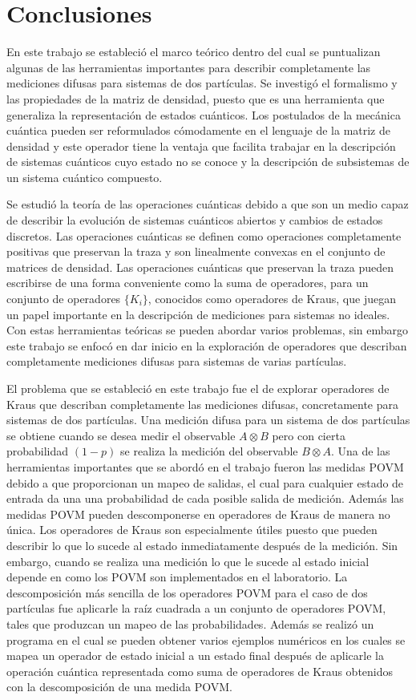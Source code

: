 \chapter{Conclusiones }

En este trabajo se estableció el marco teórico dentro del cual se puntualizan algunas de las herramientas importantes para describir completamente las mediciones difusas para sistemas de dos partículas. Se investigó el formalismo y las propiedades de la matriz de densidad, puesto que es una herramienta que generaliza la representación de estados cuánticos. Los postulados de la mecánica cuántica pueden ser reformulados cómodamente en el lenguaje de la matriz de densidad y este operador tiene la ventaja que facilita trabajar en la descripción de sistemas cuánticos cuyo estado no se conoce  y la descripción de subsistemas de un sistema cuántico compuesto. 

Se estudió la teoría de las operaciones cuánticas debido a que son un medio capaz de describir la evolución de sistemas cuánticos abiertos y cambios de estados discretos. Las operaciones cuánticas se definen como operaciones completamente positivas que preservan la traza y son linealmente convexas en el conjunto de matrices de densidad. Las operaciones cuánticas que preservan la traza pueden escribirse de una forma conveniente como la suma de operadores, para un conjunto de operadores $\{K_i\}$, conocidos como operadores de Kraus, que juegan un papel importante en la descripción de mediciones para sistemas no ideales. Con estas herramientas teóricas se pueden abordar varios problemas, sin embargo este trabajo se enfocó en dar inicio en la exploración de operadores que describan completamente mediciones difusas para sistemas de varias partículas. 


El problema que se estableció en este trabajo fue el de explorar operadores de Kraus que describan completamente las mediciones difusas, concretamente para sistemas de dos partículas. Una medición difusa para un sistema de dos partículas se obtiene cuando se desea medir el observable $A\otimes B$ pero con cierta probabilidad $(1-p)$ se realiza la medición del observable $B\otimes A $. Una de las herramientas importantes que se abordó en el trabajo fueron las medidas POVM debido a que proporcionan un mapeo de salidas, el cual para cualquier estado de entrada da una una probabilidad de cada posible salida de medición. Además las medidas POVM pueden descomponerse en operadores de Kraus de manera no única. Los operadores de Kraus son especialmente útiles puesto que pueden describir lo que lo sucede al estado inmediatamente después de la medición. Sin embargo, cuando se realiza una medición lo que le sucede al estado inicial depende en como los POVM son implementados en el laboratorio. La descomposición más sencilla de los operadores POVM para el caso de dos partículas fue aplicarle la raíz cuadrada a un conjunto de operadores POVM, tales que produzcan un mapeo de las probabilidades. Además se realizó un programa en el cual se pueden obtener varios ejemplos numéricos en los cuales se mapea un operador de estado inicial a un estado final después de aplicarle la operación cuántica representada como suma de operadores de Kraus obtenidos con la descomposición de una medida POVM\@.


